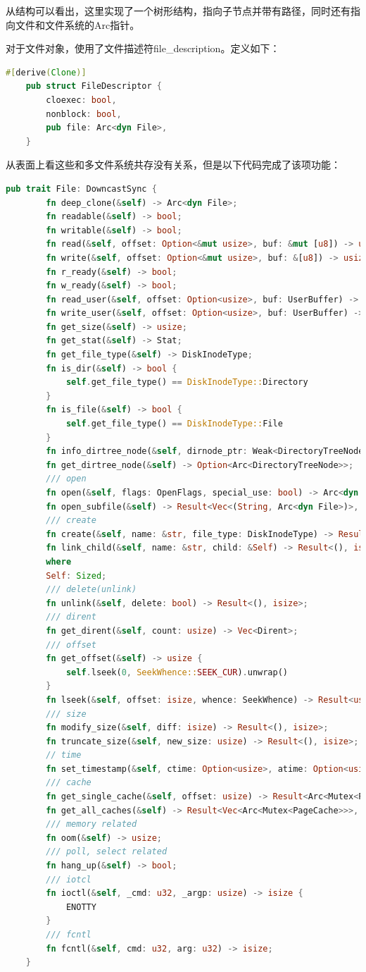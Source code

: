 从结构可以看出，这里实现了一个树形结构，指向子节点并带有路径，同时还有指向文件和文件系统的Arc指针。

对于文件对象，使用了文件描述符file\_description。定义如下：

\begin{lstlisting}[language={Rust}, label={DirectoryTreeNode},
	caption={DirectoryTreeNode}]
	#[derive(Clone)]
	pub struct FileDescriptor {
		cloexec: bool,
		nonblock: bool,
		pub file: Arc<dyn File>,
	}
\end{lstlisting}

从表面上看这些和多文件系统共存没有关系，但是以下代码完成了该项功能：
\begin{lstlisting}[language={Rust}, label={file-trait},
	caption={file\_trait}]
	pub trait File: DowncastSync {
		fn deep_clone(&self) -> Arc<dyn File>;
		fn readable(&self) -> bool;
		fn writable(&self) -> bool;
		fn read(&self, offset: Option<&mut usize>, buf: &mut [u8]) -> usize;
		fn write(&self, offset: Option<&mut usize>, buf: &[u8]) -> usize;
		fn r_ready(&self) -> bool;
		fn w_ready(&self) -> bool;
		fn read_user(&self, offset: Option<usize>, buf: UserBuffer) -> usize;
		fn write_user(&self, offset: Option<usize>, buf: UserBuffer) -> usize;
		fn get_size(&self) -> usize;
		fn get_stat(&self) -> Stat;
		fn get_file_type(&self) -> DiskInodeType;
		fn is_dir(&self) -> bool {
			self.get_file_type() == DiskInodeType::Directory
		}
		fn is_file(&self) -> bool {
			self.get_file_type() == DiskInodeType::File
		}
		fn info_dirtree_node(&self, dirnode_ptr: Weak<DirectoryTreeNode>);
		fn get_dirtree_node(&self) -> Option<Arc<DirectoryTreeNode>>;
		/// open
		fn open(&self, flags: OpenFlags, special_use: bool) -> Arc<dyn File>;
		fn open_subfile(&self) -> Result<Vec<(String, Arc<dyn File>)>, isize>;
		/// create
		fn create(&self, name: &str, file_type: DiskInodeType) -> Result<Arc<dyn File>, isize>;
		fn link_child(&self, name: &str, child: &Self) -> Result<(), isize>
		where
		Self: Sized;
		/// delete(unlink)
		fn unlink(&self, delete: bool) -> Result<(), isize>;
		/// dirent
		fn get_dirent(&self, count: usize) -> Vec<Dirent>;
		/// offset
		fn get_offset(&self) -> usize {
			self.lseek(0, SeekWhence::SEEK_CUR).unwrap()
		}
		fn lseek(&self, offset: isize, whence: SeekWhence) -> Result<usize, isize>;
		/// size
		fn modify_size(&self, diff: isize) -> Result<(), isize>;
		fn truncate_size(&self, new_size: usize) -> Result<(), isize>;
		// time
		fn set_timestamp(&self, ctime: Option<usize>, atime: Option<usize>, mtime: Option<usize>);
		/// cache
		fn get_single_cache(&self, offset: usize) -> Result<Arc<Mutex<PageCache>>, ()>;
		fn get_all_caches(&self) -> Result<Vec<Arc<Mutex<PageCache>>>, ()>;
		/// memory related
		fn oom(&self) -> usize;
		/// poll, select related
		fn hang_up(&self) -> bool;
		/// iotcl
		fn ioctl(&self, _cmd: u32, _argp: usize) -> isize {
			ENOTTY
		}
		/// fcntl
		fn fcntl(&self, cmd: u32, arg: u32) -> isize;
	}
\end{lstlisting}

